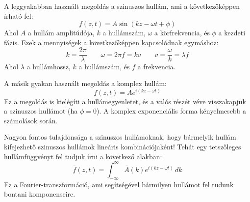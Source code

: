 \documentclass[a4paper,12pt]{article}
\begin{document}
A leggyakabban használt megoldás a szinuszos hullám, ami a következőképpen írható fel:
\begin{equation}
    f(z, t) = A \sin(kz - \omega t + \phi)
\end{equation}
Ahol $A$ a hullám amplitúdója, $k$ a hullámszám, $\omega$ a körfrekvencia, és $\phi$ a kezdeti fázis. Ezek a mennyiségek a következőképpen kapcsolódnak egymáshoz:
\begin{equation}
    k = \frac{2 \pi}{\lambda} \qquad \omega = 2 \pi f = kv \qquad v = \frac{\omega}{k} = \lambda f
\end{equation}
Ahol $\lambda$ a hullámhossz, $k$ a hullámszám, és $f$ a frekvencia.

A másik gyakan használt megoldás a komplex hullám:
\begin{equation}
    f(z, t) = A e^{i(kz - \omega t)}
\end{equation}
Ez a megoldás is kielégíti a hullámegyenletet, és a valós részét véve visszakapjuk a szinuszos hullámot (ha $\phi = 0$). A komplex exponenciális forma kényelmesebb a számolások során.

Nagyon fontos tulajdonsága a szinuszos hullámoknak, hogy bármelyik hullám kifejezhető szinuszos hullámok lineáris kombinációjaként! Tehát egy tetszőleges hullámfüggvényt fel tudjuk írni a következő alakban:
\begin{equation}
    \bar{f}(z, t) = \int_{-\infty}^{\infty} \bar{A}(k) e^{i(kz - \omega t)} \, dk
\end{equation}
Ez a Fourier-transzformáció, ami segítségével bármilyen hullámot fel tudunk bontani komponenseire.
\end{document}
